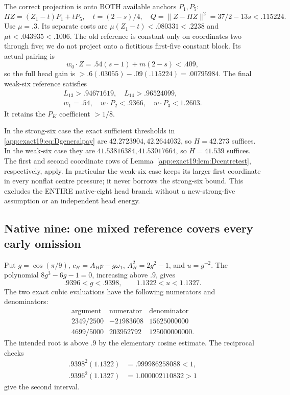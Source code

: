 \documentclass[11pt]{article}
\theoremstyle{definition}
\theoremstyle{remark}
\begin{document}
The correct projection is onto BOTH available anchors \(P_1,P_5\):
\[
 \Pi Z=(Z_1-t)P_1+tP_5,\quad t=(2-s)/4,\quad
                          Q=\|Z-\Pi Z\|^2=37/2-13s<.115224 .
\]
Use \(\mu=.3\).
Its separate costs are
\(\mu(Z_1-t)<.080331<.2238\) and \(\mu t<.043935<.1006\).
The old reference is constant only on coordinates two through five;
we do not project onto a fictitious first-five constant block.
Its actual pairing is
\[
                     w_0\cdot Z=.54(s-1)+m(2-s)<.409 ,
\]
so the full head gain is \(>.6(.03055)-.09(.115224)=.00795984\).
The final weak-six reference satisfies
\[
\begin{gathered}
 L_{13}>.94671619,\quad L_{14}>.96524099,\\
 w_1=.54,\quad w\cdot P_2<.9366,\quad w\cdot P_3<1.2603 .
\tag{D19eightweak}\label{app:exact19:eq:Deightweak}
\end{gathered}
\]
It retains the \(P_K\) coefficient \(>1/8\).

In the strong-six case the exact sufficient thresholds in
\eqref{app:exact19:eq:Dgeneralpay} are
\(42.2723904,\allowbreak 42.2644032\), so \(H=42.273\) suffices.
In the weak-six case they are \(41.53816384,\allowbreak 41.53017664\), so
\(H=41.539\) suffices.
The first and second coordinate rows of
Lemma~\ref{app:exact19:lem:Dcentretest}, respectively, apply.
In particular the weak-six case keeps its larger first coordinate in
every nonflat centre pressure; it never borrows the strong-six bound.
This excludes the ENTIRE native-eight head branch without a
new-strong-five assumption or an independent head energy.

\subsection{Native nine: one mixed reference covers every early omission}
\label{app:exact19:Dninereference}

Put \(g=\cos(\pi/9)\), \(c_H=A_Hp-g\omega_1\),
\(A_H^2=2g^2-1\), and \(u=g^{-2}\).
The polynomial \(8g^3-6g-1=0\), increasing above \(.9\), gives
\[
                    .9396<g<.9398,\qquad 1.1322<u<1.1327 .
\]
The two exact cubic evaluations have the following numerators
and denominators:
\[
\begin{array}{c|r|r}
\text{argument}&\text{numerator}&\text{denominator}\\\hline
2349/2500&-21983608&15625000000\\
4699/5000&203952792&125000000000.
\end{array}
\]
The intended root is above \(.9\) by the elementary cosine estimate.
The reciprocal checks
\[
\begin{aligned}
.9398^2(1.1322)&=.999986258088<1,\\
.9396^2(1.1327)&=1.000002110832>1
\end{aligned}
\]
give the second interval.
\end{document}
